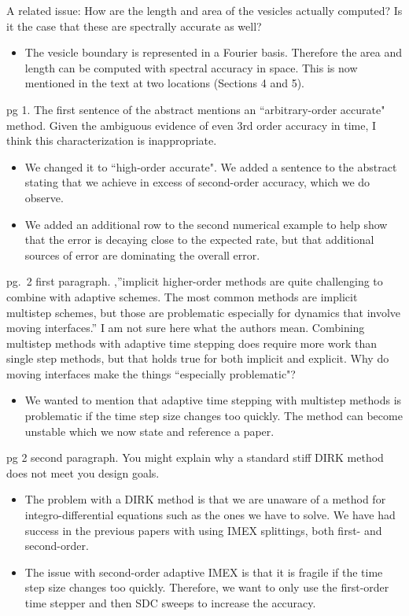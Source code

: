 \documentclass[12pt]{article}
\newcommand{\comment}[1]{{\color{blue} #1}}
\begin{document}
\comment{A related issue: How are the length and area of the vesicles
actually computed? Is it the case that these are spectrally accurate as
well?}
\begin{itemize}
  \item The vesicle boundary is represented in a Fourier basis.
  Therefore the area and length can be computed with spectral accuracy
  in space.  This is now mentioned in the text at two locations
  (Sections 4 and 5).
\end{itemize}

\comment{pg 1. The first sentence of the abstract mentions an
``arbitrary-order accurate" method. Given the ambiguous evidence of even
3rd order accuracy in time, I think this characterization is
inappropriate.}
\begin{itemize}
  \item We changed it to ``high-order accurate".  We added a sentence to
  the abstract stating that we achieve in excess of second-order
  accuracy, which we do observe.
  
  \item We added an additional row to the second numerical example to
  help show that the error is decaying close to the expected rate, but
  that additional sources of error are dominating the overall error.
\end{itemize}

\comment{pg.~2 first paragraph. ,”implicit higher-order methods are
quite challenging to combine with adaptive schemes. The most common
methods are implicit multistep schemes, but those are problematic
especially for dynamics that involve moving interfaces.” I am not sure
here what the authors mean. Combining multistep methods with adaptive
time stepping does require more work than single step methods, but that
holds true for both implicit and explicit. Why do moving interfaces make
the things ``especially problematic"?}
\begin{itemize}
  \item We wanted to mention that adaptive time stepping with multistep
  methods is problematic if the time step size changes too quickly.  The
  method can become unstable which we now state and reference a paper.
\end{itemize}

\comment{pg 2 second paragraph. You might explain why a standard stiff DIRK
method does not meet you design goals.}
\begin{itemize}
  \item The problem with a DIRK method is that we are unaware of a
  method for integro-differential equations such as the ones we have to
  solve.  We have had success in the previous papers with using IMEX
  splittings, both first- and second-order.
  \item The issue with second-order adaptive IMEX is that it is fragile
  if the time step size changes too quickly.  Therefore, we want to only
  use the first-order time stepper and then SDC sweeps to increase the
  accuracy.
\end{itemize}
\end{document}
